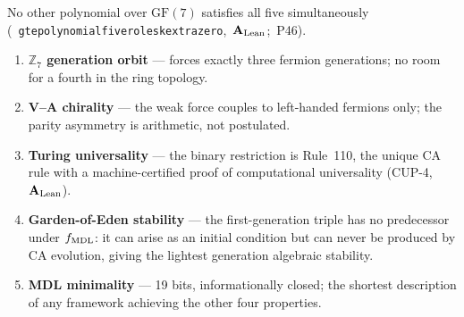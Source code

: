 \documentclass[11pt,openany]{book}
\theoremstyle{remark}
\newcommand{\lean}[1]{%
  \penalty-100
  \begingroup\def\_{\textunderscore\allowbreak}\texttt{#1}\endgroup}
\newcommand{\CatAL}{\ensuremath{\textbf{A}_{\rm Lean}}}
\begin{document}
\begin{tcolorbox}[colback=yellow!5,colframe=yellow!75!black,
  title={\textbf{One Polynomial, Five Independent Physical Roles}},
  fonttitle=\small\bfseries, left=6pt, right=6pt, top=4pt, bottom=4pt]
\small
No other polynomial over $\mathrm{GF}(7)$ satisfies all five simultaneously
\mbox{(\lean{gte\_polynomial\_five\_roles\_k\_extra\_zero}, \CatAL; P46)}.
\begin{enumerate}[label=(\roman*),itemsep=2pt,topsep=3pt,leftmargin=1.8em]
\item \textbf{$\mathbb{Z}_7$ generation orbit} — forces exactly three fermion
  generations; no room for a fourth in the ring topology.
\item \textbf{V--A chirality} — the weak force couples to left-handed fermions only;
  the parity asymmetry is arithmetic, not postulated.
\item \textbf{Turing universality} — the binary restriction is Rule~110, the unique CA
  rule with a machine-certified proof of computational universality \mbox{(CUP-4, \CatAL)}.
\item \textbf{Garden-of-Eden stability} — the first-generation triple has no predecessor
  under $f_{\rm MDL}$: it can arise as an initial condition but can never be produced
  by CA evolution, giving the lightest generation algebraic stability.
\item \textbf{MDL minimality} — 19 bits, informationally closed; the shortest description
  of any framework achieving the other four properties.
\end{enumerate}
\end{tcolorbox}
\end{document}
